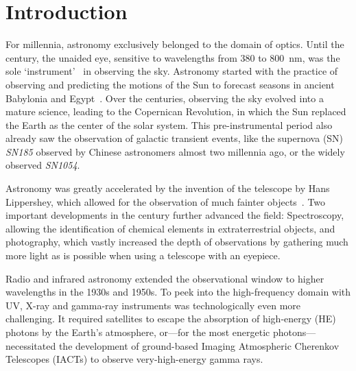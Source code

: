 \chapter*{Introduction}\label{introduction}

For millennia, astronomy exclusively belonged to the domain of optics. Until the  century, the unaided eye, sensitive to wavelengths from \num{380} to \SI{800}{\nano\m}, was the sole `instrument'~ in observing the sky. Astronomy started with the practice of observing and predicting the motions of the Sun to forecast seasons in ancient Babylonia and Egypt~. Over the centuries, observing the sky evolved into a mature science, leading to the Copernican Revolution, in which the Sun replaced the Earth as the center of the solar system. This pre-instrumental period also already saw the observation of galactic transient events, like the supernova (SN) \emph{SN185} observed by Chinese astronomers almost two millennia ago, or the widely observed \emph{SN1054}.

Astronomy was greatly accelerated by the invention of the telescope by Hans Lippershey, which allowed for the observation of much fainter objects~. Two important developments in the  century further advanced the field: Spectroscopy, allowing the identification of chemical elements in extraterrestrial objects, and photography, which vastly increased the depth of observations by gathering much more light as is possible when using a telescope with an eyepiece.

Radio and infrared astronomy extended the observational window to higher wavelengths in the 1930s and 1950s. To peek into the high-frequency domain with UV, X-ray and gamma-ray instruments was technologically even more challenging. It required satellites to escape the absorption of high-energy (HE) photons by the Earth's atmosphere, or---for the most energetic photons---necessitated the development of ground-based Imaging Atmospheric Cherenkov Telescopes (IACTs) to observe very-high-energy gamma rays.

